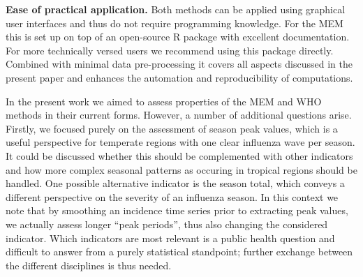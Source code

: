 \documentclass{article}
\begin{document}
\begin{description}
\item \textbf{Ease of practical application.} Both methods can be applied using graphical user interfaces and thus do not require programming knowledge. For the MEM this is set up on top of an open-source R package with excellent documentation. For more technically versed users we recommend using this package directly. Combined with minimal data pre-processing it covers all aspects discussed in the present paper and enhances the automation and reproducibility of computations.
\end{description}



In the present work we aimed to assess properties of the MEM and WHO methods in their current forms. However, a number of additional questions arise. Firstly, we focused purely on the assessment of season peak values, which is a useful perspective for temperate regions with one clear influenza wave per season. It could be discussed whether this should be complemented with other indicators and how more complex seasonal patterns as occuring in tropical regions should be handled. One possible alternative indicator is the season total, which conveys a different perspective on the severity of an influenza season. In this context we note that by smoothing an incidence time series prior to extracting peak values, we actually assess longer ``peak periods'', thus also changing the considered indicator. Which indicators are most relevant is a public health question and difficult to answer from a purely statistical standpoint; further exchange between the different disciplines is thus needed. %
\end{document}
